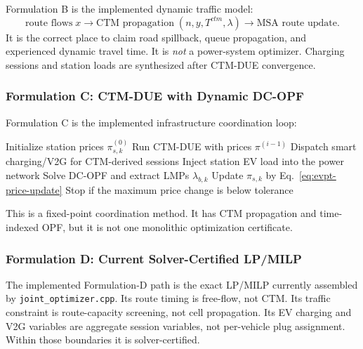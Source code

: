 Formulation B is the implemented dynamic traffic model:
\[
  \text{route flows}\;x
  \longrightarrow
  \text{CTM propagation}\;(n,y,T^{ctm},\lambda)
  \longrightarrow
  \text{MSA route update}.
\]
It is the correct place to claim road spillback, queue propagation, and
experienced dynamic travel time. It is \emph{not} a power-system optimizer.
Charging sessions and station loads are synthesized after CTM-DUE convergence.

\subsubsection{Formulation C: CTM-DUE with Dynamic DC-OPF}
\label{sec:evpt-ctm-joint}

Formulation C is the implemented infrastructure coordination loop:
\begin{algorithm}[H]
\caption{CTM-DUE and dynamic DC-OPF price coordination}
\begin{algorithmic}[1]
\State Initialize station prices \(\pi^{(0)}_{s,k}\)
  \State Run CTM-DUE with prices \(\pi^{(i-1)}\)
  \State Dispatch smart charging/V2G for CTM-derived sessions
    \State Inject station EV load into the power network
    \State Solve DC-OPF and extract LMPs \(\lambda_{b,k}\)
    \State Update \(\pi_{s,k}\) by Eq.~\eqref{eq:evpt-price-update}
  \EndFor
  \State Stop if the maximum price change is below tolerance
\EndFor
\end{algorithmic}
\end{algorithm}
This is a fixed-point coordination method. It has CTM propagation and
time-indexed OPF, but it is not one monolithic optimization certificate.

\subsubsection{Formulation D: Current Solver-Certified LP/MILP}
\label{sec:evpt-formulation-d}

The implemented Formulation-D path is the exact LP/MILP currently assembled by
\texttt{joint\_optimizer.cpp}. Its route timing is free-flow, not CTM. Its
traffic constraint is route-capacity screening, not cell propagation. Its EV
charging and V2G variables are aggregate session variables, not per-vehicle
plug assignment. Within those boundaries it is solver-certified.

